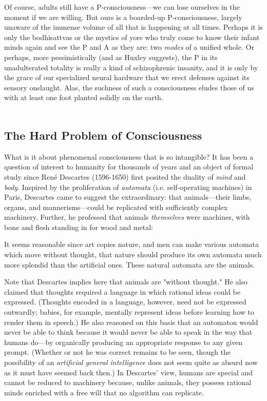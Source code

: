 Of course, adults still have a P-consciousness---we can lose ourselves in the moment if we are willing. But ours is a boarded-up P-consciousness, largely unaware of the immense volume of all that is happening at all times. Perhaps it is only the bodhisattvas or the mystics of yore who truly come to know their infant minds again and see the P and A as they are: two \textit{modes} of a unified whole. Or perhaps, more pessimistically (and as Huxley suggests), the P in its unadulterated totality is really a kind of schizophrenic insanity, and it is only by the grace of our specialized neural hardware that we erect defenses against its sensory onslaught. Alas, the suchness of such a consciousness eludes those of us with at least one foot planted solidly on the earth. \\\\

\subsection{The Hard Problem of Consciousness}
What is it about phenomenal consciousness that is so intangible? It has been a question of interest to humanity for thousands of years and an object of formal study since Ren\'e Descartes (1596-1650) first posited the duality of \textit{mind} and \textit{body}. Inspired by the proliferation of \textit{automata} (i.e. self-operating machines) in Paris, Descartes came to suggest the extraordinary: that animals---their limbs, organs, and mannerisms---could be replicated with sufficiently complex machinery. Further, he professed that animals \textit{themselves} were machines, with bone and flesh standing in for wood and metal: \\
        
\begin{displayquote}
    It seems reasonable since art copies nature, and men can make various automata which move without thought, that nature should produce its own automata much more splendid than the artificial ones. These natural automata are the animals. \\
\end{displayquote}
        
Note that Descartes implies here that animals are "without thought." He also claimed that thoughts required a language in which rational ideas could be expressed. (Thoughts encoded in a language, however, need not be expressed outwardly; babies, for example, mentally represent ideas before learning how to render them in speech.) He also reasoned on this basis that an automaton would never be able to think because it would never be able to speak in the way that humans do---by organically producing an appropriate response to any given prompt. (Whether or not he was correct remains to be seen, though the possibility of an \textit{artificial general intelligence} does not seem quite as absurd now as it must have seemed back then.) In Descartes' view, humans are special and cannot be reduced to machinery because, unlike animals, they possess rational minds enriched with a free will that no algorithm can replicate. \\
        
